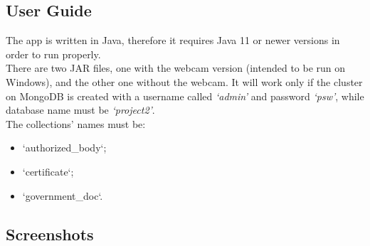\documentclass[12pt, a4paper]{article}
\begin{document}
\subsection{User Guide}

The app is written in Java, therefore it requires Java 11 or newer versions in order to 
run properly. \\
There are two JAR files, one with the webcam version (intended to be run on Windows), 
and the other one without the webcam. 
It will work only if the cluster on MongoDB is created with a username called 
\emph{‘admin’} and password \emph{‘psw’}, while database name must be \emph{‘project2’}. \\
The collections' names must be: 
\begin{itemize}
    \item ‘authorized\_body‘;
    \item ‘certificate‘;
    \item ‘government\_doc‘.
\end{itemize}


\clearpage %

\subsection{Screenshots}
\end{document}
